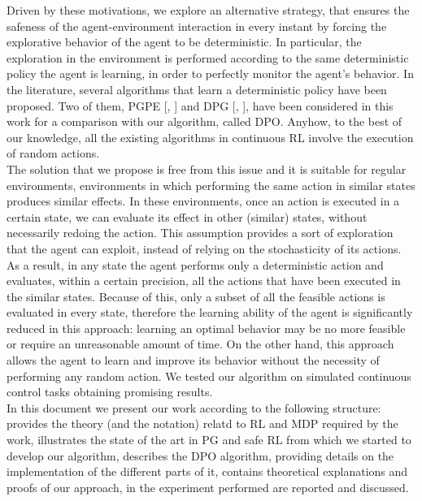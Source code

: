 \newline
Driven by these motivations, we explore an alternative strategy, that ensures the safeness of the agent-environment interaction in every instant by forcing the explorative behavior of the agent to be deterministic. In particular, the exploration in the environment is performed according to the same deterministic policy the agent is learning, in order to perfectly monitor the agent's behavior. In the literature, several algorithms that learn a deterministic policy have been proposed. Two of them, \acf{PGPE} [\citet{sehnke2008PolicyGradient}, ] and \acf{DPG} [\citet{article}, ], have been considered in this work for a comparison with our algorithm, called \acf{DPO}. Anyhow, to the best of our knowledge, all the existing algorithms in continuous \ac{RL} involve the execution of random actions.\\
\newline
The solution that we propose is free from this issue and it is suitable for regular environments, \ie environments in which performing the same action in similar states produces similar effects. In these environments, once an action is executed in a certain state, we can evaluate its effect in other (similar) states, without necessarily redoing the action. This assumption provides a sort of exploration that the agent can exploit, instead of relying on the stochasticity of its actions. As a result, in any state the agent performs only a deterministic action and evaluates, within a certain precision, all the actions that have been executed in the similar states. Because of this, only a subset of all the feasible actions is evaluated in every state, therefore the learning ability of the agent is significantly reduced in this approach: learning an optimal behavior may be no more feasible or require an unreasonable amount of time. On the other hand, this approach allows the agent to learn and improve its behavior without the necessity of performing any random action. We tested our algorithm on simulated continuous control tasks obtaining promising results.\\
\newline
In this document we present our work according to the following structure:  provides the theory (and the notation) relatd to \acf{RL} and \acf{MDP} required by the work,  illustrates the state of the art  in \acf{PG} and safe \ac{RL} from which we started to develop our algorithm,  describes the \ac{DPO} algorithm, providing details on the implementation of the different parts of it,  contains theoretical explanations and proofs of our approach, in  the experiment performed are reported and discussed. 
